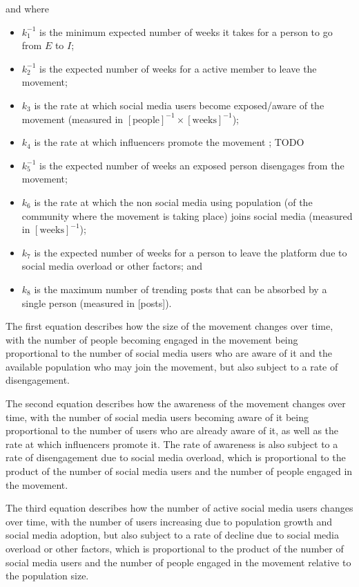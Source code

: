 \documentclass{article}
\begin{document}
    and where
    \begin{itemize}
        \item $k_1^{-1}$ is the minimum expected number of weeks it takes for a person to go from $E$ to $I$;
        \item $k_2^{-1}$ is the expected number of weeks for a active member to leave the movement;
        \item $k_3$ is the rate at which social media users become exposed/aware of the movement (measured in $[\text{people}]^{-1}\times[\text{weeks}]^{-1}$);
        \item $k_4$ is the rate at which influencers promote the movement ; TODO
        \item $k_5^{-1}$ is the expected number of weeks an exposed person disengages from the movement;
        \item $k_6$ is the rate at which the non social media using population (of the community where the movement is taking place) joins social media (measured in $[\text{weeks}]^{-1}$);
        \item $k_7$ is the expected number of weeks for a person to leave the platform due to social media overload or other factors; and
        \item $k_8$ is the maximum number of trending posts that can be absorbed by a single person (measured in [posts]).
    \end{itemize}
    
    The first equation describes how the size of the movement changes over time, with the number of people becoming engaged in the movement being proportional to the number of social media users who are aware of it and the available population who may join the movement, but also subject to a rate of disengagement. 
    
	The second equation describes how the awareness of the movement changes over time, with the number of social media users becoming aware of it being proportional to the number of users who are already aware of it, as well as the rate at which influencers promote it. The rate of awareness is also subject to a rate of disengagement due to social media overload, which is proportional to the product of the number of social media users and the number of people engaged in the movement. 
 
	The third equation describes how the number of active social media users changes over time, with the number of users increasing due to population growth and social media adoption, but also subject to a rate of decline due to social media overload or other factors, which is proportional to the product of the number of social media users and the number of people engaged in the movement relative to the population size. 
 
\end{document}
